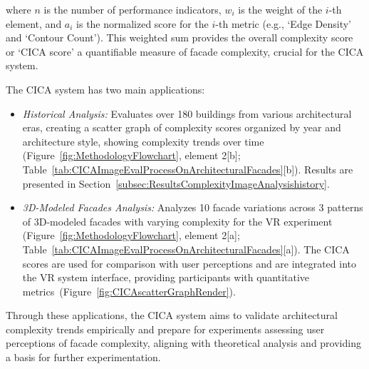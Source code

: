 where \(n\) is the number of performance indicators, \(w_i\) is the weight of the \(i\)-th element, and \(a_i\) is the normalized score for the \(i\)-th metric (e.g., `Edge Density' and `Contour Count').
This weighted sum provides the overall complexity score or `CICA score' a quantifiable measure of facade complexity, crucial for the CICA system.

The CICA system has two main applications:
\begin{itemize}
    \item \textit{Historical Analysis:} Evaluates over 180 buildings from various architectural eras, creating a scatter graph of complexity scores organized by year and architecture style, showing complexity trends over time (Figure~\ref{fig:MethodologyFlowchart}, element 2[b]; Table~\ref{tab:CICAImageEvalProcessOnArchitecturalFacades}[b]). Results are presented in Section~\ref{subsec:ResultsComplexityImageAnalysishistory}.
    \item \textit{3D-Modeled Facades Analysis:} Analyzes 10 facade variations across 3 patterns of 3D-modeled facades with varying complexity for the VR experiment (Figure~\ref{fig:MethodologyFlowchart}, element 2[a]; Table~\ref{tab:CICAImageEvalProcessOnArchitecturalFacades}[a]). The CICA scores are used for comparison with user perceptions and are integrated into the VR system interface, providing participants with quantitative metrics~(Figure~\ref{fig:CICAscatterGraphRender}).
\end{itemize}

Through these applications, the CICA system aims to validate architectural complexity trends empirically and prepare for experiments assessing user perceptions of facade complexity, aligning with theoretical analysis and providing a basis for further experimentation.
